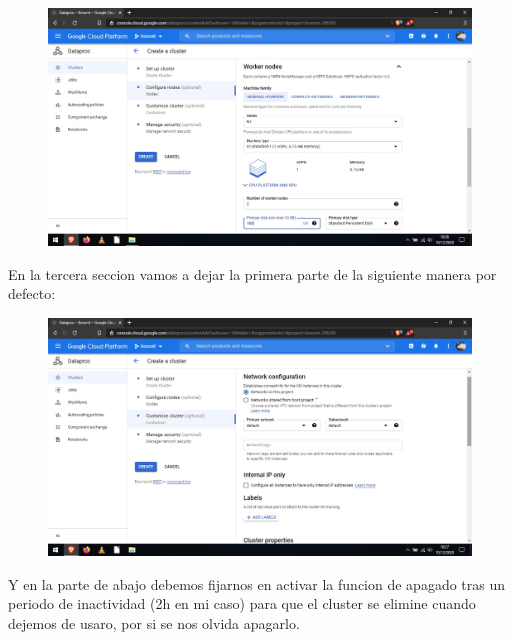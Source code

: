 \documentclass[a4paper,10pt]{article}
\begin{document}
\begin{figure}[H]
\begin{center}
\includegraphics[width=500pt]{./fotos/GoogleCloud/29 - GC.jpg}
\end{center}
\end{figure}

En la tercera seccion vamos a dejar la primera parte de la siguiente manera por defecto:

\begin{figure}[H]
\begin{center}
\includegraphics[width=500pt]{./fotos/GoogleCloud/30 - GC.jpg}
\end{center}
\end{figure}

Y en la parte de abajo debemos fijarnos en activar la funcion de apagado tras un periodo de inactividad (2h en mi caso) para que el cluster se elimine cuando dejemos de usaro, por si se nos olvida apagarlo.
\end{document}
